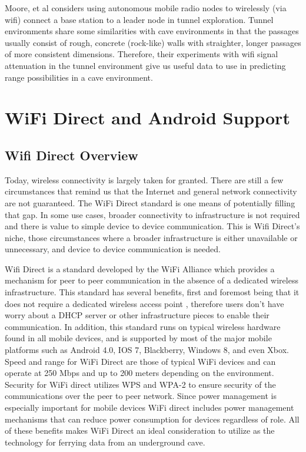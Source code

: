 \documentclass[10pt,twocolumn]{article}
\begin{document}
Moore, et al \cite{moore2012} considers using autonomous mobile radio nodes to wirelessly (via wifi) connect a base station to a leader node in tunnel exploration. 
Tunnel environments share some similarities with cave environments in that the passages usually consist of rough, concrete (rock-like) walls with straighter, longer passages of more consistent dimensions. 
Therefore, their experiments with wifi signal attenuation in the tunnel environment give us useful data to use in predicting range possibilities in a cave environment.

\section{WiFi Direct and Android Support}

\subsection{Wifi Direct Overview}
Today, wireless connectivity is largely taken for granted. 
There are still a few circumstances that remind us that the Internet and general network connectivity are not guaranteed. 
The WiFi Direct standard is one means of potentially filling that gap. 
In some use cases, broader connectivity to infrastructure is not required and there is value to simple device to device communication. 
This is Wifi Direct's niche, those circumstances where a broader infrastructure is either unavailable or unnecessary, and device to device communication is needed.

Wifi Direct is a standard developed by the WiFi Alliance which provides a mechanism for peer to peer communication in the absence of a dedicated wireless infrastructure. 
This standard has several benefits, first and foremost being that it does not require a dedicated wireless access point \cite{whywifid}
, therefore users don't have worry about a DHCP server or other infrastructure pieces to enable their communication. 
In addition, this standard runs on typical wireless hardware found in all mobile devices, and is supported by most of the major mobile platforms such as Android 4.0, IOS 7, Blackberry, Windows 8, and even Xbox. 
Speed and range for WiFi Direct are those of typical WiFi devices and can operate at 250 Mbps and up to 200 meters depending on the environment. 
Security for WiFi direct utilizes WPS and WPA-2 to ensure security of the communications over the peer to peer network. 
Since power management is especially important for mobile devices WiFi direct includes power management mechanisms that can reduce power consumption for devices regardless of role.
All of these benefits makes WiFi Direct an ideal consideration to utilize as the technology for ferrying data from an underground cave.
\end{document}
